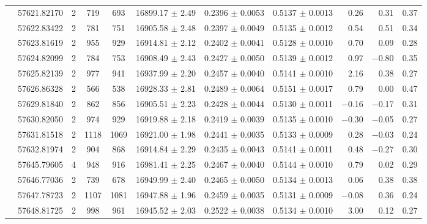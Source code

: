 \documentclass[a4paper,fleqn,usenatbib]{mnras}
\begin{document}
\begin{table*}
\begin{threeparttable}
{\begin{tabular}{c c c c c c c c r r c}
 & 57621.82170  & 2 &  719 & 693 & 16899.17 $\pm$ 2.49  &   0.2396 $\pm$ 0.0053  &   0.5137 $\pm$ 0.0013  &     0.26  &    0.31    &  0.37\\  
 & 57622.83422  & 2 &  781 & 751 & 16905.58 $\pm$ 2.48  &   0.2397 $\pm$ 0.0049  &   0.5135 $\pm$ 0.0012  &     0.54  &    0.51    &  0.34\\  
 & 57623.81619  & 2 &  955 & 929 & 16914.81 $\pm$ 2.12  &   0.2402 $\pm$ 0.0041  &   0.5128 $\pm$ 0.0010  &     0.70  &    0.09    &  0.28\\  
 & 57624.82099  & 2 &  784 & 753 & 16908.49 $\pm$ 2.43  &   0.2427 $\pm$ 0.0050  &   0.5139 $\pm$ 0.0012  &     0.97  &   $-$0.80    &  0.35\\  
 & 57625.82139  & 2 &  977 & 941 & 16937.99 $\pm$ 2.20  &   0.2457 $\pm$ 0.0040  &   0.5141 $\pm$ 0.0010  &     2.16  &    0.38    &   0.27\\  
 & 57626.86328  & 2 &  566 & 538 & 16928.33 $\pm$ 2.81  &   0.2489 $\pm$ 0.0064  &   0.5151 $\pm$ 0.0017  &     0.79  &    0.00    &  0.47\\  
 & 57629.81840  & 2 &  862 & 856 & 16905.51 $\pm$ 2.23  &   0.2428 $\pm$ 0.0044  &   0.5130 $\pm$ 0.0011  &$-$0.16  &   $-$0.17    &  0.31\\  
 & 57630.82050  & 2 &  974 & 929 & 16919.88 $\pm$ 2.18  &   0.2419 $\pm$ 0.0039  &   0.5135 $\pm$ 0.0010  &$-$0.30  &   $-$0.05    &  0.27\\  
 & 57631.81518  & 2 & 1118 & 1069 & 16921.00 $\pm$ 1.98  &   0.2441 $\pm$ 0.0035  &   0.5133 $\pm$ 0.0009  &     0.28  &   $-$0.03    &  0.24\\   
 & 57632.81974  & 2 &  904 & 868 & 16914.84 $\pm$ 2.29  &   0.2435 $\pm$ 0.0043  &   0.5141 $\pm$ 0.0011  &     0.48  &    $-$0.27    &  0.30\\[3pt] 
\parbox[t]{1mm}{} & 57645.79605  & 4 & 948 & 916 & 16981.41 $\pm$ 2.25  &   0.2467 $\pm$ 0.0040  &   0.5144 $\pm$ 0.0010  &     0.79  & 0.02 & 0.29\\  
 & 57646.77036  & 2 &   739 &   678 & 16949.99 $\pm$ 2.40  &   0.2465 $\pm$ 0.0050  &   0.5134 $\pm$ 0.0013  &     0.06  &    0.38    &  0.38\\   
 & 57647.78723  & 2 &  1107 & 1081 & 16947.88 $\pm$ 1.96  &   0.2459 $\pm$ 0.0035  &   0.5131 $\pm$ 0.0009  &$-$0.08  &    0.36    &  0.24\\   
 & 57648.81725  & 2 &   998 &   961 & 16945.52 $\pm$ 2.03  &   0.2522 $\pm$ 0.0038  &   0.5134 $\pm$ 0.0010  &     3.00  &    0.12    &  0.27\\  

\end{tabular}}
\end{threeparttable}
\end{table*}
\end{document}
